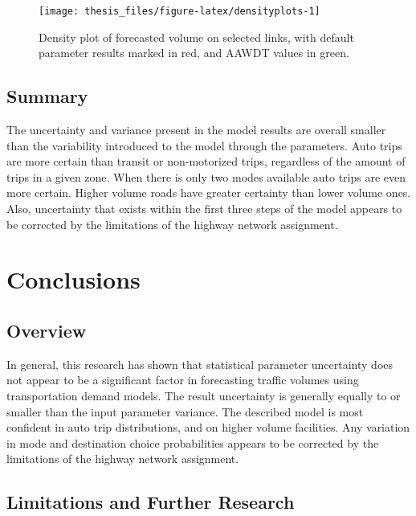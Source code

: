 \documentclass[fancy, masters,twoside]{byuthesis}
\begin{document}
\begin{sidewaysfigure}

{\centering \texttt{[image: thesis\_files/figure-latex/densityplots-1]} 

}

\caption{Density plot of forecasted volume on selected links, with default parameter results marked in red, and AAWDT values in green.}\label{fig:densityplots}
\end{sidewaysfigure}

\hypertarget{summary-2}{%
\section{Summary}\label{summary-2}}

The uncertainty and variance present in the model results are overall smaller than the variability introduced to the model through the parameters. Auto trips are more certain than transit or non-motorized trips, regardless of the amount of trips in a given zone. When there is only two modes available auto trips are even more certain. Higher volume roads have greater certainty than lower volume ones. Also, uncertainty that exists within the first three steps of the model appears to be corrected by the limitations of the highway network assignment.

\hypertarget{conclusions}{%
\chapter{Conclusions}\label{conclusions}}

\hypertarget{overview-3}{%
\section{Overview}\label{overview-3}}

In general, this research has shown that statistical parameter uncertainty does not appear to be a significant factor in forecasting traffic volumes using transportation demand models. The result uncertainty is generally equally to or smaller than the input parameter variance. The described model is most confident in auto trip distributions, and on higher volume facilities. Any variation in mode and destination choice probabilities appears to be corrected by the limitations of the highway network assignment.

\hypertarget{limitations-and-further-research}{%
\section{Limitations and Further Research}\label{limitations-and-further-research}}
\end{document}
